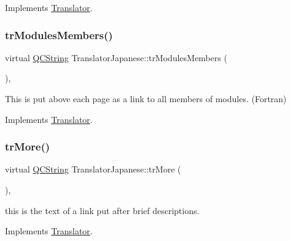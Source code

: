 Implements \mbox{\hyperlink{class_translator}{Translator}}.

\mbox{\label{class_translator_japanese_a4175582f2eac50a965e39f1cfca2b125}} 
\subsubsection{\texorpdfstring{trModulesMembers()}{trModulesMembers()}}
{\footnotesize\ttfamily virtual \mbox{\hyperlink{class_q_c_string}{Q\+C\+String}} Translator\+Japanese\+::tr\+Modules\+Members (\begin{DoxyParamCaption}{ }\end{DoxyParamCaption})\hspace{0.3cm}{\ttfamily [inline]}, {\ttfamily [virtual]}}

This is put above each page as a link to all members of modules. (Fortran) 

Implements \mbox{\hyperlink{class_translator}{Translator}}.

\mbox{\label{class_translator_japanese_ace0d0d1b6449e2ca250714c3893b856a}} 
\subsubsection{\texorpdfstring{trMore()}{trMore()}}
{\footnotesize\ttfamily virtual \mbox{\hyperlink{class_q_c_string}{Q\+C\+String}} Translator\+Japanese\+::tr\+More (\begin{DoxyParamCaption}{ }\end{DoxyParamCaption})\hspace{0.3cm}{\ttfamily [inline]}, {\ttfamily [virtual]}}

this is the text of a link put after brief descriptions. 

Implements \mbox{\hyperlink{class_translator}{Translator}}.

\mbox{\label{class_translator_japanese_a1112852197d7af74daae91dedd6a6d12}} 
